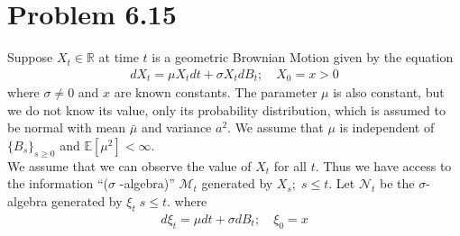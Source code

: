\documentclass[11pt]{article}
\newcommand{\bbr}{\mathbb{R}}
\newcommand{\ncal}{\mathcal{N}}
\newcommand{\mcal}{\mathcal{M}}
\newcommand{\gs}{\sigma}
\newcommand{\E}{\mathbb{E}}
\newcommand{\seq}[1]{\{#1\}}
\begin{document}
\section*{Problem 6.15}
Suppose $X_t \in \bbr$ at time $t$ is a geometric Brownian Motion given by the equation
\begin{align*}
d X _ { t } = \mu X _ { t } d t + \sigma X _ { t } d B _ { t } ; \quad X _ { 0 } = x > 0
\end{align*}
where $\gs \neq 0$ and $x$ are known constants.  The parameter $\mu$ is also constant, but we do not know its value, only its probability distribution, which is assumed to be normal with mean $\bar{\mu}$ and variance $a^2$.  We assume that $\mu$ is independent of $\seq{B_s}_{s \geq 0}$ and $\E [\mu^2 ] < \infty$. \\
We assume that we can observe the value of $X_t$ for all $t$.  Thus we have access to the information ``($\gs$ -algebra)'' $\mcal_t$ generated by $X_s; \; s \leq t$.  Let $\ncal_t$ be the $\gs$-algebra generated by $\xi_t \; s \leq t$.  where 
\begin{align*}
d \xi _ { t } = \mu d t + \sigma d B _ { t } ; \quad \xi _ { 0 } = x
\end{align*}
\end{document}
